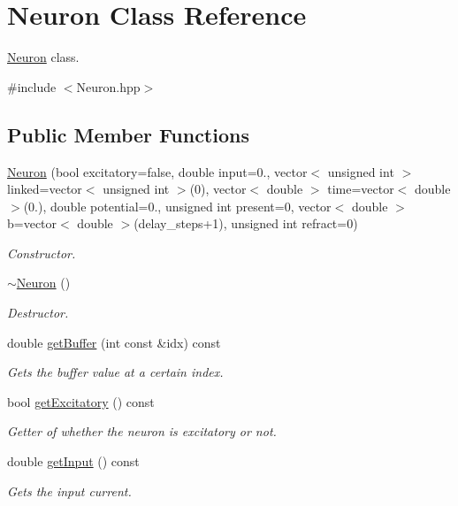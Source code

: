 \hypertarget{classNeuron}{\section{Neuron Class Reference}
\label{classNeuron}
}


\hyperlink{classNeuron}{Neuron} class.  




{\ttfamily \#include $<$Neuron.\-hpp$>$}

\subsection*{Public Member Functions}
\begin{DoxyCompactItemize}
\item 
\hyperlink{classNeuron_a6808c05f7aeabce8bd5b72cf05f7d3c4}{Neuron} (bool excitatory=false, double input=0., vector$<$ unsigned int $>$ linked=vector$<$ unsigned int $>$(0), vector$<$ double $>$ time=vector$<$ double $>$(0.), double potential=0., unsigned int present=0, vector$<$ double $>$ b=vector$<$ double $>$(delay\-\_\-steps+1), unsigned int refract=0)
\begin{DoxyCompactList}\small\item\em Constructor. \end{DoxyCompactList}\item 
\hyperlink{classNeuron_a94a250ce7e167760e593979b899745b1}{$\sim$\-Neuron} ()
\begin{DoxyCompactList}\small\item\em Destructor. \end{DoxyCompactList}\item 
double \hyperlink{classNeuron_a020167e5c41dcb992c17029aaee2af01}{get\-Buffer} (int const \&idx) const 
\begin{DoxyCompactList}\small\item\em Gets the buffer value at a certain index. \end{DoxyCompactList}\item 
bool \hyperlink{classNeuron_a185f67cb52f92805222fcef8e8236e43}{get\-Excitatory} () const 
\begin{DoxyCompactList}\small\item\em Getter of whether the neuron is excitatory or not. \end{DoxyCompactList}\item 
double \hyperlink{classNeuron_a9519b367ae5080ae9ed9c796685853f8}{get\-Input} () const 
\begin{DoxyCompactList}\small\item\em Gets the input current. \end{DoxyCompactList}\item 

\end{DoxyCompactItemize}
